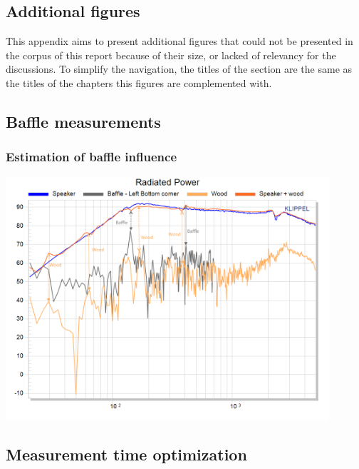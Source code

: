 \documentclass{report}
\begin{document}
\begin{appendices}

\chapter{Additional figures}
This appendix aims to present additional figures that could not be presented in the corpus of this report because of their size, or lacked of relevancy for the discussions. To simplify the navigation, the titles of the section are the same as the titles of the chapters this figures are complemented with. 


\section{Baffle measurements}
\subsection{Estimation of baffle influence}
\label{Curves:BaffleInfluence}

\begin{center}
	\includegraphics[width=0.9\textwidth]{Appendix/Vib_RadPow}
    \captionsetup{hypcap=false}
    \label{Curves:Baffle_RadPow}
\end{center}


\section{Measurement time optimization}


\end{appendices}
\end{document}
